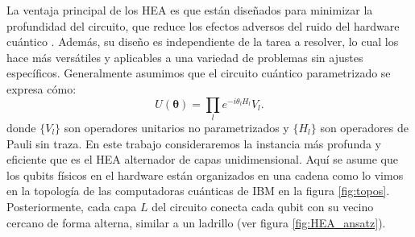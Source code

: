 \documentclass[letterpaper,12pt]{thesisECFM}
\theoremstyle{plain}
\theoremstyle{definition}
\theoremstyle{definition}
\theoremstyle{remark}
\newcommand{\1}{\mathbb{1}}
\begin{document}
La ventaja principal de los HEA es que están diseñados para minimizar la profundidad del circuito, que reduce los efectos adversos del ruido del hardware cuántico \cite{HEA}. Además, su diseño es independiente de la tarea a resolver, lo cual los hace más versátiles y aplicables a una variedad de problemas sin ajustes específicos.
Generalmente asumimos que el circuito cuántico parametrizado se expresa cómo: 
\begin{equation}
    U(\bm{\theta}) = \prod\limits_{l} e^{-i\theta_lH_l} V_l.
\end{equation}
donde $\{V_l\}$ son operadores unitarios no parametrizados y $\{H_l\}$ son operadores de Pauli sin traza.
En este trabajo consideraremos la instancia más profunda y eficiente que es el HEA alternador de capas unidimensional. Aquí se asume que los qubits físicos en el hardware están organizados en una cadena como lo vimos en la topología de las computadoras cuánticas de IBM en la figura \ref{fig:topos}. 
Posteriormente, cada capa $L$ del circuito conecta cada qubit con su vecino cercano de forma alterna, similar a un ladrillo (ver figura \ref{fig:HEA_ansatz}).  
\end{document}
